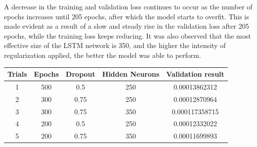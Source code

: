 \documentclass[a4paper,11pt,oneside]{book}
\begin{document}
A decrease in the training and validation loss continues to occur as the number of epochs increases until 205
epochs, after which the model starts to overfit. This is made evident as a result of a slow and steady rise
in the validation loss after 205 epochs, while the training loss keeps reducing.
It was also observed that the most effective size of the LSTM network is 350, and the higher the intensity
of regularization applied, the better the model was able to perform.
\begin{center}
	\begin{tabular}{||c c c c c||} 
		\hline
		Trials & Epochs & Dropout & Hidden Neurons & Validation result\\ [0.5ex] 
		\hline\hline
		1 & 500 & 0.5 & 250 & 0.00013862312 \\ 
		\hline
		2 & 300 & 0.75 & 250 & 0.00012870964 \\
		\hline
		3 & 300 & 0.75 & 350 & 0.000117358715 \\
		\hline
		4 & 200 & 0.5 & 250 & 0.00012332022 \\
		\hline
		5 & 200 & 0.75 & 350 & 0.00011699893\\ [1ex] 
		\hline
	\end{tabular}
\end{center}
\end{document}
